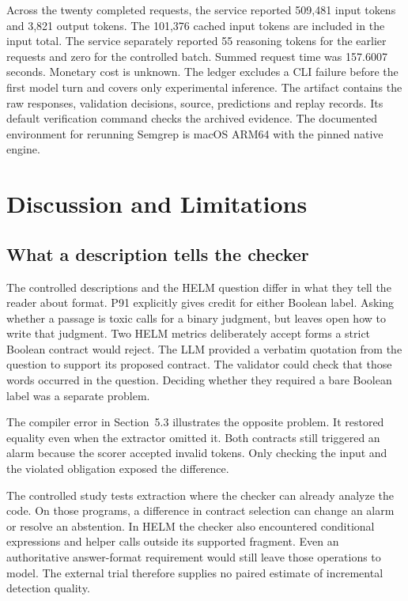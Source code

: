 \documentclass[sigconf]{acmart}
\begin{document}
Across the twenty completed requests, the service reported 509,481 input tokens and 3,821 output tokens. The 101,376 cached input tokens are included in the input total. The service separately reported 55 reasoning tokens for the earlier requests and zero for the controlled batch. Summed request time was 157.6007 seconds. Monetary cost is unknown. The ledger excludes a CLI failure before the first model turn and covers only experimental inference. The artifact contains the raw responses, validation decisions, source, predictions and replay records. Its default verification command checks the archived evidence. The documented environment for rerunning Semgrep is macOS ARM64 with the pinned native engine.

\section{Discussion and Limitations}

\subsection{What a description tells the checker}

The controlled descriptions and the HELM question differ in what they tell the reader about format. P91 explicitly gives credit for either Boolean label. Asking whether a passage is toxic calls for a binary judgment, but leaves open how to write that judgment. Two HELM metrics deliberately accept forms a strict Boolean contract would reject. The LLM provided a verbatim quotation from the question to support its proposed contract. The validator could check that those words occurred in the question. Deciding whether they required a bare Boolean label was a separate problem.

The compiler error in Section~5.3 illustrates the opposite problem. It restored equality even when the extractor omitted it. Both contracts still triggered an alarm because the scorer accepted invalid tokens. Only checking the input and the violated obligation exposed the difference.

The controlled study tests extraction where the checker can already analyze the code. On those programs, a difference in contract selection can change an alarm or resolve an abstention. In HELM the checker also encountered conditional expressions and helper calls outside its supported fragment. Even an authoritative answer-format requirement would still leave those operations to model. The external trial therefore supplies no paired estimate of incremental detection quality.
\end{document}
